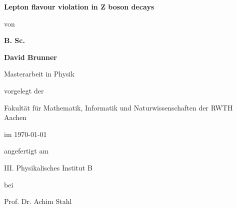 
\begin{titlepage}
    \begin{center}
        \vspace*{1cm}
        
        \Huge
        \textbf{Lepton flavour violation in Z boson decays}
        
        \vspace{0.5cm}
        
        \large
        
        von
        
        \vspace{0.5cm}
	
	\textbf{B. Sc.}	
	
	\vspace{0.3cm}
        
        \textbf{David Brunner}
        
        \vspace{4.0cm}
        
        Masterarbeit in Physik
        
        \vspace{0.5cm}
        
        vorgelegt der 
        
        \vspace{0.5cm}
        
        Fakultät für Mathematik, Informatik und Naturwissenschaften der RWTH Aachen
        
        \vspace{0.5cm}
        
        im \today{}
        
        \vspace{0.5cm}
        
        angefertigt am
        
        \vspace{0.5cm}
        
        III. Physikalisches Institut B
        
        \vspace{0.5cm}
        
        bei 
        
        \vspace{0.5cm}
        
        Prof. Dr. Achim Stahl
    
    \end{center}
\end{titlepage}
\restoregeometry

